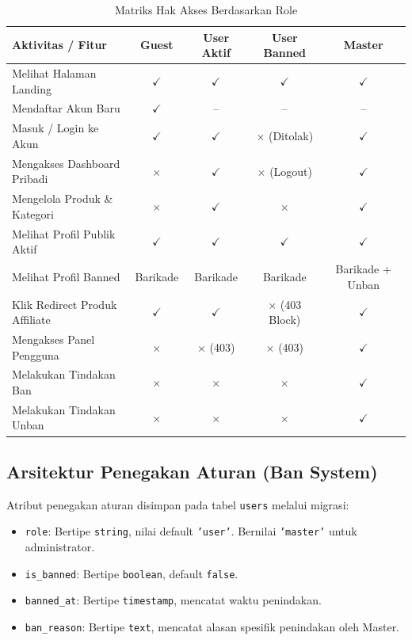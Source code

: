\documentclass[12pt,a4paper]{article}
\begin{document}
\begin{table}[H]
    \centering
    \small
    \caption{Matriks Hak Akses Berdasarkan Role}
    \begin{tabularx}{\textwidth}{>{\raggedright\arraybackslash}Xcccc}
        \toprule
        \textbf{Aktivitas / Fitur} & \textbf{Guest} & \textbf{User Aktif} & \textbf{User Banned} & \textbf{Master} \\
        \midrule
        Melihat Halaman Landing & $\checkmark$ & $\checkmark$ & $\checkmark$ & $\checkmark$ \\
        Mendaftar Akun Baru & $\checkmark$ & -- & -- & -- \\
        Masuk / Login ke Akun & $\checkmark$ & $\checkmark$ & $\times$ (Ditolak) & $\checkmark$ \\
        Mengakses Dashboard Pribadi & $\times$ & $\checkmark$ & $\times$ (Logout) & $\checkmark$ \\
        Mengelola Produk \& Kategori & $\times$ & $\checkmark$ & $\times$ & $\checkmark$ \\
        Melihat Profil Publik Aktif & $\checkmark$ & $\checkmark$ & $\checkmark$ & $\checkmark$ \\
        Melihat Profil Banned & Barikade & Barikade & Barikade & Barikade + Unban \\
        Klik Redirect Produk Affiliate & $\checkmark$ & $\checkmark$ & $\times$ (403 Block) & $\checkmark$ \\
        Mengakses Panel Pengguna & $\times$ & $\times$ (403) & $\times$ (403) & $\checkmark$ \\
        Melakukan Tindakan Ban & $\times$ & $\times$ & $\times$ & $\checkmark$ \\
        Melakukan Tindakan Unban & $\times$ & $\times$ & $\times$ & $\checkmark$ \\
        \bottomrule
    \end{tabularx}
\end{table}

\subsection{Arsitektur Penegakan Aturan (Ban System)}
Atribut penegakan aturan disimpan pada tabel \texttt{users} melalui migrasi:
\begin{itemize}[noitemsep]
    \item \texttt{role}: Bertipe \texttt{string}, nilai default \texttt{'user'}. Bernilai \texttt{'master'} untuk administrator.
    \item \texttt{is\_banned}: Bertipe \texttt{boolean}, default \texttt{false}.
    \item \texttt{banned\_at}: Bertipe \texttt{timestamp}, mencatat waktu penindakan.
    \item \texttt{ban\_reason}: Bertipe \texttt{text}, mencatat alasan spesifik penindakan oleh Master.
\end{itemize}
\end{document}
